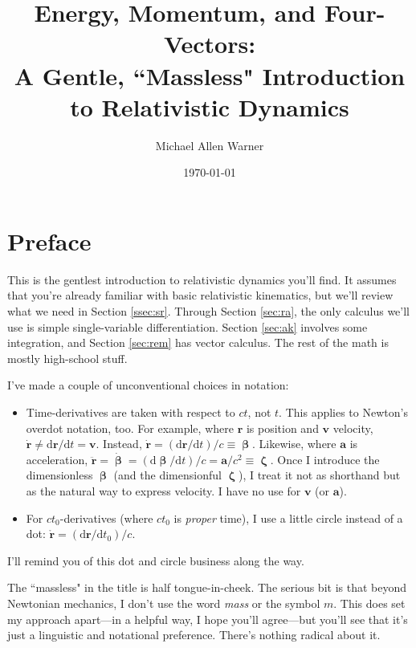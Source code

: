 \documentclass[12pt]{article}
\renewcommand{\vv}[1]{\mathbf{#1}}
\newcommand{\dd}[1]{\mathrm{d}#1}
\newcommand{\vvbeta}{\bm{\upbeta}}
\newcommand{\vvzeta}{\bm{\upzeta}}
\begin{document}
\title{Energy, Momentum, and Four-Vectors:\\A Gentle, ``Massless" Introduction\\to Relativistic Dynamics}
\author{Michael Allen Warner}
\date{\today}
\maketitle

\section{Preface}\label{sec:p}

This is the gentlest introduction to relativistic dynamics you'll find. It assumes that you're already familiar with basic relativistic kinematics, but we'll review what we need in Section \ref{ssec:sr}. Through Section \ref{sec:ra}, the only calculus we'll use is simple single-variable differentiation. Section \ref{sec:ak} involves some integration, and Section \ref{sec:rem} has vector calculus. The rest of the math is mostly high-school stuff.

I've made a couple of unconventional choices in notation:
\begin{itemize}
\item Time-derivatives are taken with respect to $ct$, not $t$. This applies to Newton's overdot notation, too. For example, where $\vv r$ is position and $\vv v$ velocity, $\dot{\vv r} \neq \dd \vv r / \dd t = \vv v$. Instead, $\dot{\vv r} = (\dd \vv r / \dd t)/c \equiv \vvbeta$. Likewise, where $\vv a$ is acceleration, $\ddot{\vv r} = \dot{\vvbeta} = (\dd \vvbeta / \dd t)/c = \vv a / c^2 \equiv \vvzeta$. Once I introduce the dimensionless $\vvbeta$ (and the dimensionful $\vvzeta$), I treat it not as shorthand but as the natural way to express velocity. I have no use for $\vv v$ (or $\vv a$).
\item For $c t_0$-derivatives (where $ct_0$ is \emph{proper} time), I use a little circle instead of a dot: $\mathring{\vv r} = (\dd \vv r / \dd t_0)/c$.
\end{itemize}
I'll remind you of this dot and circle business along the way.

The ``massless" in the title is half tongue-in-cheek. The serious bit is that beyond Newtonian mechanics, I don't use the word \emph{mass} or the symbol $m$. This does set my approach apart---in a helpful way, I hope you'll agree---but you'll see that it's just a linguistic and notational preference. There's nothing radical about it.
\end{document}
